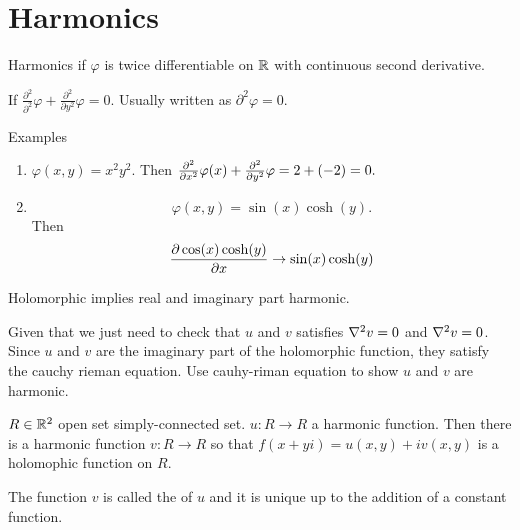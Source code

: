 \section{Harmonics}
\begin{Definition}
Harmonics if \(\varphi\) is twice differentiable on \(\mathbb{R}\) with continuous second derivative.
\end{Definition}

If \(\frac{\partial^2}{\partial^2} \varphi + \frac{\partial^2}{\partial y^2}\varphi =0 \).  Usually written as \(\partial^2 \varphi=0\). 

Examples
\begin{enumerate}
\item \(\varphi(x,y)=x^2y^2\). Then \(\frac{\partial^2}{\partial x^2} \varphi(x)  +\frac{\partial^2}{\partial y^2} \varphi = 2+(-2)=0.\)
\item \[\varphi(x,y)=\sin(x)\cosh(y).\] Then \[\frac{\partial \cos(x)\cosh(y)}{\partial x} \to \sin(x)\cosh(y)\]
\end{enumerate}

\begin{Theorem}
Holomorphic implies real and imaginary part harmonic.
\end{Theorem}

Given that we just need to check that \(u\) and \(v\) satisfies \(\nabla^2v=0\) and \(\nabla^2v=0\). Since \(u\) and \(v\) are the imaginary part of the holomorphic function, they satisfy the cauchy rieman equation. 
Use cauhy-riman equation to show \(u\) and \(v\) are harmonic.

\begin{Theorem}
\(R\in \mathbb{R}^2\) open set simply-connected set. \(u\colon R\to R\) a harmonic function. Then there is a harmonic function \(v\colon R\to R\) so that \(f(x+yi)=u(x,y)+iv(x,y)\) is a holomophic function on \(R\). 
\end{Theorem}

The function \(v\) is called the  of \(u\) and it is unique up to the addition of a constant function. 

